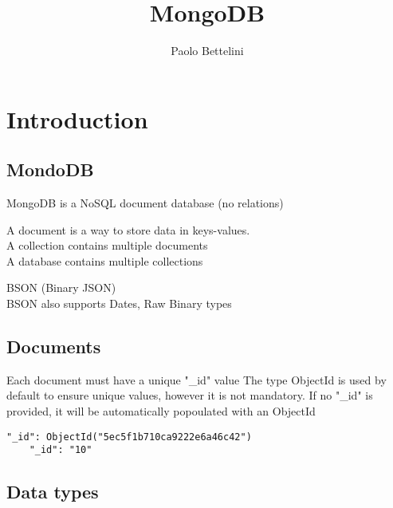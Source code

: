 \documentclass[a4paper]{article}
\title{MongoDB}
\author{Paolo Bettelini}
\date{}
\begin{document}
\maketitle
\tableofcontents
\pagebreak

\section{Introduction}

\subsection{MondoDB}

MongoDB is a NoSQL document database (no relations)

A document is a way to store data in keys-values.
\\
A collection contains multiple documents
\\
A database contains multiple collections

BSON (Binary JSON)
\\
BSON also supports Dates, Raw Binary types

\subsection{Documents}

Each document must have a unique "\_id" value
The type ObjectId is used by default to ensure unique values,
however it is not mandatory.
If no "\_id" is provided, it will be automatically popoulated with an ObjectId

\begin{lstlisting}[style=js]
    "_id": ObjectId("5ec5f1b710ca9222e6a46c42")
    "_id": "10"
\end{lstlisting}

\subsection{Data types}
\end{document}
